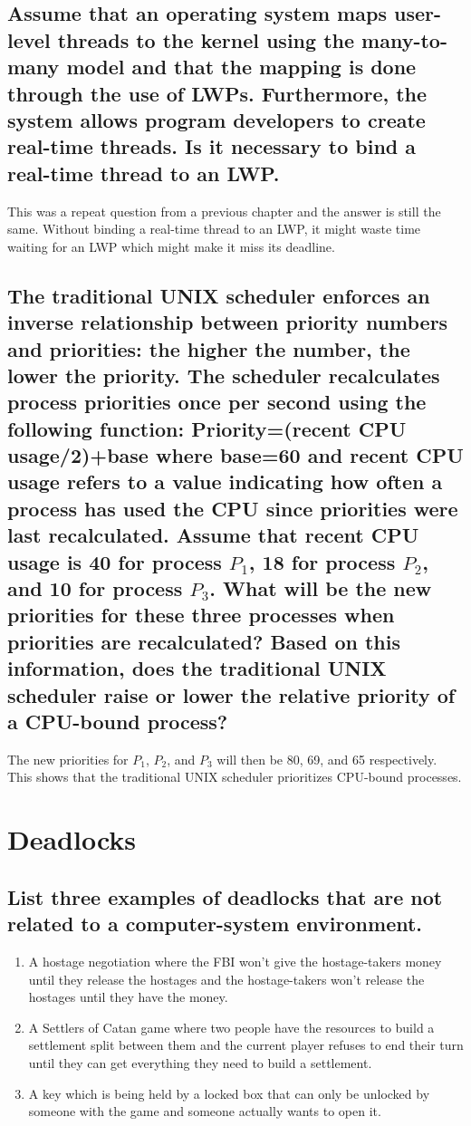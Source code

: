 \documentclass{book}%
\begin{document}
\section{Assume that an operating system maps user-level threads to the kernel using the many-to-many model and that the mapping is done through the use of LWPs. Furthermore, the system allows program developers to create real-time threads. Is it necessary to bind a real-time thread to an LWP.}
This was a repeat question from a previous chapter and the answer is still the same. Without binding a real-time thread to an LWP, it might waste time waiting for an LWP which might make it miss its deadline.
\section{The traditional UNIX scheduler enforces an inverse relationship between priority numbers and priorities: the higher the number, the lower the priority. The scheduler recalculates process priorities once per second using the following function: Priority=(recent CPU usage/2)+base where base=60 and recent CPU usage refers to a value indicating how often a process has used the CPU since priorities were last recalculated. Assume that recent CPU usage is 40 for process $P_1$, 18 for process $P_2$, and 10 for process $P_3$. What will be the new priorities for these three processes when priorities are recalculated? Based on this information, does the traditional UNIX scheduler raise or lower the relative priority of a CPU-bound process?}
The new priorities for $P_1$, $P_2$, and $P_3$ will then be 80, 69, and 65 respectively. This shows that the traditional UNIX scheduler prioritizes CPU-bound processes.
\chapter{Deadlocks}
\section{List three examples of deadlocks that are not related to a computer-system environment.}
\begin{enumerate}
\item A hostage negotiation where the FBI won't give the hostage-takers money until they release the hostages and the hostage-takers won't release the hostages until they have the money.
\item A Settlers of Catan game where two people have the resources to build a settlement split between them and the current player refuses to end their turn until they can get everything they need to build a settlement.
\item A key which is being held by a locked box that can only be unlocked by someone with the game and someone actually wants to open it.
\end{enumerate}
\end{document}

